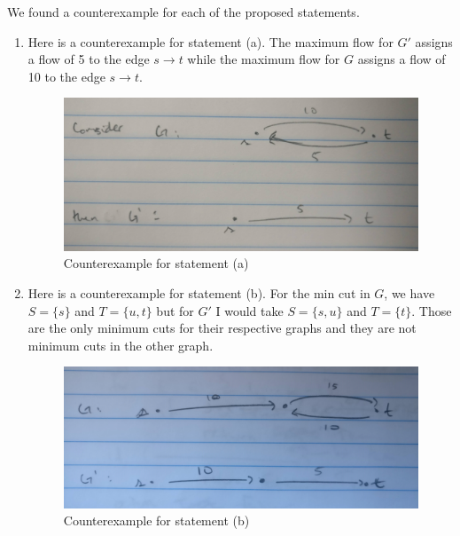 \documentclass{article}
\begin{document}
We found a counterexample for each of the proposed statements.
\begin{enumerate}[label=(\alph*)]
    \item Here is a counterexample for statement (a).
    The maximum flow for $G'$ assigns a flow of 5 to the edge $s \to t$ while the maximum flow for $G$ assigns a flow of 10 to the edge $s \to t$.
        \begin{figure}[h]
        \begin{center}
            \includegraphics[scale=0.25]{img/7-4-a}
            \caption{Counterexample for statement (a)}
            \label{fig:7-4-a}
        \end{center}
        \end{figure}
    \item Here is a counterexample for statement (b).
    For the min cut in $G$, we have $S = \{ s \} $ and $T = \{ u, t \} $ but for $G'$ I would take $S = \{ s, u \} $ and $T = \{ t \}$.
    Those are the only minimum cuts for their respective graphs and they are not minimum cuts in the other graph.
        \begin{figure}[h]
        \begin{center}
            \includegraphics[scale=0.08,angle=90]{img/7-4-b}
            \caption{Counterexample for statement (b)}
            \label{fig:7-4-b}
        \end{center}
        \end{figure}

\end{enumerate}
\end{document}
